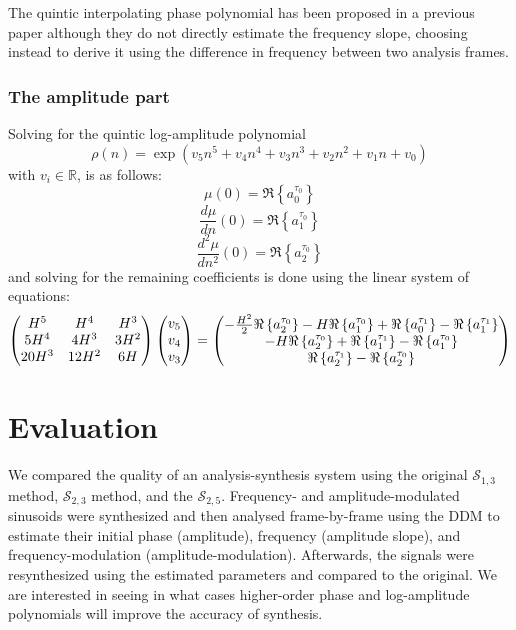 The quintic interpolating phase polynomial has been proposed in a previous paper
\cite{girin2003comparing} although they do not directly estimate the frequency
slope, choosing instead to derive it using the difference in frequency between
two analysis frames.

\subsubsection{The amplitude part}

\raggedbottom\afterpage{\flushbottom}%
Solving for the quintic log-amplitude polynomial
\begin{equation}
    \label{eq:quinticamppoly}
    \rho(n) = \exp \left(v_5 n^{5} + v_4 n^{4} + v_3 n^{3} + v_2 n^{2} + v_1 n + v_0 \right)
\end{equation}
with $v_i \in \mathbb{R}$, is as follows:
\[
    \mu(0) = \Re \left\{ a^{\tau_0}_0 \right\}
\]
\[
    \frac{d \mu}{d n}(0) = \Re \left\{ a^{\tau_0}_1 \right\}
\]
\[
    \frac{d^{2} \mu}{d n^{2}}(0) = \Re \left\{ a^{\tau_0}_2 \right\}
\]
and solving for the remaining coefficients is done using the linear system of
equations:
\[
    \begin{pmatrix}
        H^5 & H^4 & H^3 \\
        5 H^4 & 4 H^3 & 3 H^2 \\
        20 H^3 & 12 H^2 & 6 H
    \end{pmatrix}
    \begin{pmatrix}
        v_5 \\
        v_4 \\
        v_3
    \end{pmatrix}
    =
    \begin{pmatrix}
        -\frac{ H^{2} }{2} \Re \left\{  a^{\tau_0}_2  \right\} - H \Re \left\{  a^{\tau_0}_1  \right\} +
            \Re \left\{  a^{\tau_1}_0  \right\} - \Re \left\{  a^{\tau_1}_1  \right\} \\
        -H \Re \left\{  a^{\tau_0}_2  \right\} + \Re \left\{  a^{\tau_1}_1  \right\} - \Re \left\{  a^{\tau_0}_1  \right\} \\
        \Re \left\{  a^{\tau_1}_2  \right\} - \Re \left\{  a^{\tau_0}_2  \right\}
    \end{pmatrix}
\]

\section{Evaluation}

We compared the quality of an analysis-synthesis system using the original
$\mathscr{S}_{1,3}$ method, $\mathscr{S}_{2,3}$ method, and the
$\mathscr{S}_{2,5}$. Frequency- and amplitude-modulated sinusoids were
synthesized and then analysed frame-by-frame using the DDM to estimate their
initial phase (amplitude), frequency (amplitude slope), and frequency-modulation
(amplitude-modulation). Afterwards, the signals were resynthesized using the
estimated parameters and compared to the original.  We are interested in seeing
in what cases higher-order phase and log-amplitude polynomials will improve the accuracy of
synthesis.

